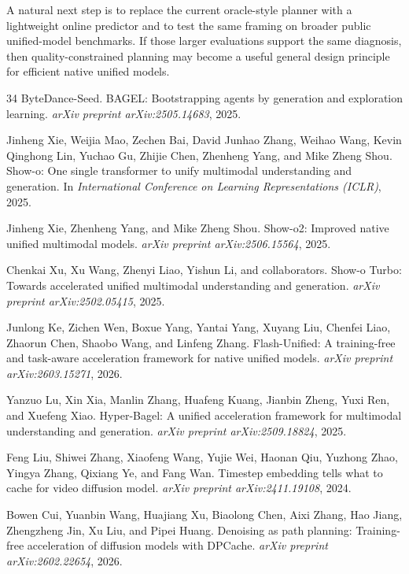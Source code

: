 \documentclass{article}
\begin{document}
A natural next step is to replace the current oracle-style planner with a lightweight online predictor and to test the same framing on broader public unified-model benchmarks. If those larger evaluations support the same diagnosis, then quality-constrained planning may become a useful general design principle for efficient native unified models.
\begin{thebibliography}{34}
ByteDance-Seed.
\newblock BAGEL: Bootstrapping agents by generation and exploration learning.
\newblock \emph{arXiv preprint arXiv:2505.14683}, 2025.

Jinheng Xie, Weijia Mao, Zechen Bai, David Junhao Zhang, Weihao Wang, Kevin Qinghong Lin, Yuchao Gu, Zhijie Chen, Zhenheng Yang, and Mike Zheng Shou.
\newblock Show-o: One single transformer to unify multimodal understanding and generation.
\newblock In \emph{International Conference on Learning Representations (ICLR)}, 2025.

Jinheng Xie, Zhenheng Yang, and Mike Zheng Shou.
\newblock Show-o2: Improved native unified multimodal models.
\newblock \emph{arXiv preprint arXiv:2506.15564}, 2025.

Chenkai Xu, Xu Wang, Zhenyi Liao, Yishun Li, and collaborators.
\newblock Show-o Turbo: Towards accelerated unified multimodal understanding and generation.
\newblock \emph{arXiv preprint arXiv:2502.05415}, 2025.

Junlong Ke, Zichen Wen, Boxue Yang, Yantai Yang, Xuyang Liu, Chenfei Liao, Zhaorun Chen, Shaobo Wang, and Linfeng Zhang.
\newblock Flash-Unified: A training-free and task-aware acceleration framework for native unified models.
\newblock \emph{arXiv preprint arXiv:2603.15271}, 2026.

Yanzuo Lu, Xin Xia, Manlin Zhang, Huafeng Kuang, Jianbin Zheng, Yuxi Ren, and Xuefeng Xiao.
\newblock Hyper-Bagel: A unified acceleration framework for multimodal understanding and generation.
\newblock \emph{arXiv preprint arXiv:2509.18824}, 2025.

Feng Liu, Shiwei Zhang, Xiaofeng Wang, Yujie Wei, Haonan Qiu, Yuzhong Zhao, Yingya Zhang, Qixiang Ye, and Fang Wan.
\newblock Timestep embedding tells what to cache for video diffusion model.
\newblock \emph{arXiv preprint arXiv:2411.19108}, 2024.

Bowen Cui, Yuanbin Wang, Huajiang Xu, Biaolong Chen, Aixi Zhang, Hao Jiang, Zhengzheng Jin, Xu Liu, and Pipei Huang.
\newblock Denoising as path planning: Training-free acceleration of diffusion models with DPCache.
\newblock \emph{arXiv preprint arXiv:2602.22654}, 2026.


\end{thebibliography}
\end{document}
